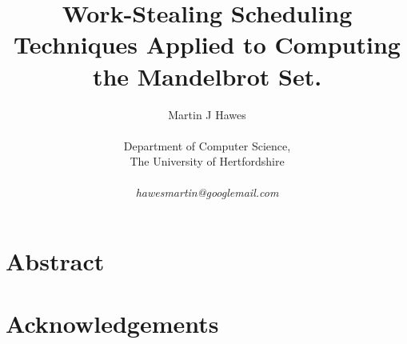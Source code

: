 

\title{
\huge Work-Stealing Scheduling Techniques Applied to Computing the Mandelbrot Set.
}

\author{
  Martin J Hawes\\
  \\
  Department of Computer Science, \\
  The University of Hertfordshire \\ 
  \\
  \textit{hawesmartin@googlemail.com}\\
}



\maketitle
\date{}

\section*{Abstract}


\section*{Acknowledgements}

\clearpage
{}
\setcounter{page}{1}
\tableofcontents


